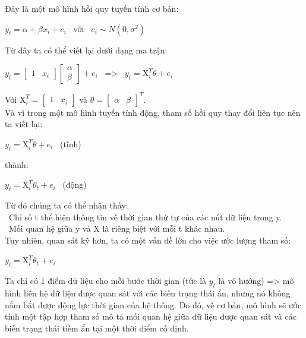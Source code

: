 \documentclass[conference]{IEEEtran}
\begin{document}
Đây là một mô hình hồi quy tuyến tính cơ bản:
\begin{center}

    \(y_{t} = \alpha + \beta x_{i} + e_{i}\) \ với \ \(e_{i} \sim N(0,\sigma^{2})\)

\end{center}

Từ đây ta có thể viết lại dưới dạng ma trận:

\begin{center}

    \(y_{t} = \begin{bmatrix}
        1 & x_{i}
    \end{bmatrix}\begin{bmatrix}
        \alpha \\\beta
    \end{bmatrix} + e_{i}\) \ => \ \(y_{t} = \mathrm{X}_{i}^{T}\theta + e_{i}\)

\end{center}
Với \(\mathrm{X}_{i}^{T} = \begin{bmatrix} 1 & x_{i} \end{bmatrix} \) và \(\theta = \begin{bmatrix} \alpha & \beta \end{bmatrix}^T\).\\

Và vì trong một mô hình tuyến tính động, tham số hồi quy thay đổi liên tục nên ta viết lại:
\begin{center}
    \(y_{t} = \mathrm{X}_{i}^{T}\theta + e_{i}\) \ (tĩnh)
\end{center}
thành:
\begin{center}
    \(y_{t} = \mathrm{X}_{i}^{T}\theta_{t} + e_{i}\) \ (động)
\end{center}
Từ đó chúng ta có thể nhận thấy:\\
\indent\textbullet\ Chỉ số t thể hiện thông tin về thời gian thứ tự của các nút dữ liệu trong y.\\
\indent\textbullet\ Mối quan hệ giữa y và X là riêng biệt với mỗi t khác nhau.\\
Tuy nhiên, quan sát kỹ hơn, ta có một vấn đề lớn cho việc ước lượng tham số:
\begin{center}
    \(y_{t} = \mathrm{X}_{i}^{T}\theta_{t} + e_{i}\)
\end{center}

Ta chỉ có 1 điểm dữ liệu cho mỗi bước thời gian (tức là \(y_{t}\) là vô hướng) => mô hình liên hệ dữ liệu được quan sát với các biến trạng thái ẩn, nhưng nó không nắm bắt được động lực thời gian của hệ thống. Do đó, về cơ bản, mô hình sẽ ước tính một tập hợp tham số mô tả mối quan hệ giữa dữ liệu được quan sát và các biến trạng thái tiềm ẩn tại một thời điểm cố định.
\end{document}
